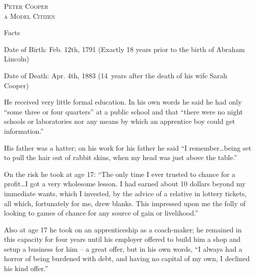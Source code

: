 \documentclass{article}
\begin{document}
\centering
{}
\fontsize{0.8in}{0.6in}\selectfont
\scshape 
{} Peter Cooper \\
 a Model Citizen

\vspace{0.05in}

\fontsize{16pt}{16pt}\selectfont
{}
\justify
Facts

\vspace{0.1in}

\begin{minipage}[t]{0.46\linewidth}
\fontsize{10.7pt}{12.7pt}\selectfont
\raggedright
\upshape
\begin{enumList}

\item Date of Birth: Feb. 12th, 1791 (Exactly 18 years prior to the birth of
{\mdseries Abraham Lincoln})

\item Date of Death: Apr. 4th, 1883 (14~years after the death of his wife
{\mdseries Sarah Cooper})

\item He received {\mdseries very little formal education}. In his own words
he said he had only ``some three or four quarters'' at a public school and
that ``there were no night schools or laboratories nor any means by which an
apprentice boy could get information.''

\item His father was a hatter; on his work for his father he said ``I
remember\ldots being set to pull the hair out of rabbit skins, when {\mdseries
my head was just above the table}.''

\item On the risk he took at age 17: ``The only time I ever trusted to chance
for a profit\ldots I got a very wholesome lesson. I had earned about 10
dollars beyond my immediate wants, which I invested, by the advice of a
relative in lottery tickets, all which, fortunately for me, drew blanks. This
impressed upon me the {\mdseries folly of looking to games of chance} for any
source of gain or livelihood.''

\item Also at age 17 he took on an apprenticeship as a coach-maker; he remained in
this capacity for four years until his employer offered to build him a shop
and setup a business for him -- a great offer, but in his own words, ``I
always had a {\mdseries horror of being burdened with debt}, and having no
capital of my own, {\mdseries I declined his kind offer}.''


\end{enumList}
\end{minipage}
\end{document}
